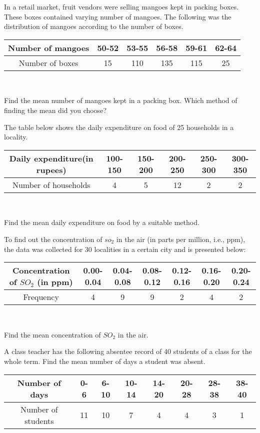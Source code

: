 \item In a retail market, fruit vendors were selling mangoes kept in packing boxes. These
boxes contained varying number of mangoes. The following was the distribution of
mangoes according to the number of boxes.
\begin{tabular}{|c|c|c|c|c|c|}
\hline
Number of mangoes&50-52&53-55&56-58&59-61&62-64\\
\hline
Number of boxes&15&110&135&115&25\\
\hline
\end{tabular}\\
\par Find the mean number of mangoes kept in a packing box. Which method of finding
the mean did you choose?
\item The table below shows the daily expenditure on food of 25 households in a locality.
\begin{tabular}{|c|c|c|c|c|c|}
\hline
Daily expenditure(in rupees)&100-150&150-200&200-250&250-300&300-350 \\
\hline
Number of households&4&5&12&2&2\\
\hline
\end{tabular}\\
\par Find the mean daily expenditure on food by a suitable method.
\item To find out the concentration of $so_2$ in the air (in parts per million, i.e., ppm), the data was collected for 30 localities in a certain city and is presented below:
\begin{tabular}{|c|c|c|c|c|c|c|}
\hline
Concentration of $SO_2$ (in ppm)&0.00-0.04&0.04-0.08&0.08-0.12&0.12-0.16&0.16-0.20& 
0.20-0.24 \\
\hline
Frequency&4&9&9&2&4&2\\
\hline
\end{tabular}\\
\par Find the mean concentration of $SO_2$ in the air.
\item A class teacher has the following absentee record of 40 students of a class for the whole
term. Find the mean number of days a student was absent.
\begin{tabular}{|c|c|c|c|c|c|c|c|}
\hline
Number of days&0-6&6-10&10-14&14-20&20-28&28-38&38-40 \\
\hline
Number of students&11&10&7&4&4&3&1\\
\hline
\end{tabular}\\
